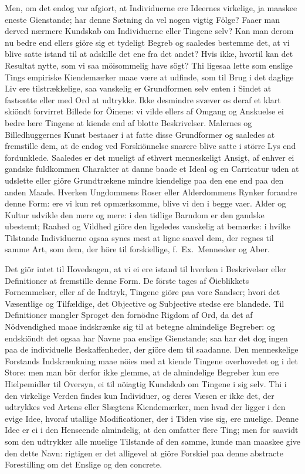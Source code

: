 \documentclass[12pt,a4paper]{article}
\newcommand{\opage}[1]{\marginnote{\footnotesize\textit{[#1]}}}
\begin{document}
Men, om det endog var afgiort, at Individuerne ere Ideernes virkelige, ja
maaskee eneste Gienstande; har denne Sætning da vel nogen vigtig Fölge?
Faaer man derved nærmere Kundskab om Individuerne eller Tingene selv? Kan
man derom nu bedre end ellers giöre sig et tydeligt Begreb og saaledes
bestemme det, at vi blive satte istand til at adskille det ene fra det
andet? Hvis ikke, hvortil kan det Resultat nytte, som vi saa möisommelig
have sögt? Thi ligesaa lette som enslige Tings empiriske Kiendemærker maae
være at udfinde, som til Brug i det daglige Liv ere tilstrækkelige, saa
vanskelig er Grundformen selv enten i Sindet at fastsætte eller med Ord at
udtrykke. Ikke desmindre svæver os deraf et klart skiöndt forvirret Billede
for Öinene: vi vilde ellers af Omgang og Anskuelse ei bedre lære Tingene at
kiende end af blotte Beskrivelser. Malernes og Billedhuggernes Kunst
bestaaer i at fatte disse Grundformer og saaledes at fremstille dem, at de
endog ved Forskiönnelse snarere blive satte i större Lys end fordunklede.
Saaledes er det mueligt af ethvert menneskeligt Ansigt, af enhver ei
gandske fuldkommen Charakter at danne baade et Ideal og en Carricatur uden
at udslette eller giöre Grundtrækene mindre kiendelige paa den ene end paa
den anden
\opage{240} Maade. Hverken Ungdommens Roser eller Alderdommens Rynker forandre denne
Form: ere vi kun ret opmærksomme, blive vi den i begge vaer. Alder og
Kultur udvikle den mere og mere: i den tidlige Barndom er den gandske
ubestemt; Raahed og Vildhed giöre den ligeledes vanskelig at bemærke: i
hvilke Tilstande Individuerne ogsaa synes mest at ligne saavel dem, der
regnes til samme Art, som dem, der höre til forskiellige, f.~Ex.\ Mennesker
og Aber.

Det giör intet til Hovedsagen, at vi ei ere istand til hverken i
Beskrivelser eller Definitioner at fremstille denne Form. De förste tages
af Öieblikkets Fornemmelser, eller af de Indtryk, Tingene giöre paa vore
Sandser; hvori det Væsentlige og Tilfældige, det Objective og Subjective
stedse ere blandede. Til Definitioner mangler Sproget den fornödne Rigdom
af Ord, da det af Nödvendighed maae indskrænke sig til at betegne
almindelige Begreber: og endskiöndt det ogsaa har Navne paa enslige
Gienstande; saa har det dog ingen paa de individuelle Beskaffenheder, der
giöre dem til saadanne. Den menneskelige Forstands Indskrænkning maae nöies
med at kiende Tingene overhovedet og i det Store: men man bör derfor ikke
glemme, at de almindelige Begreber kun ere Hielpemidler til Oversyn, ei til
nöiagtig Kundskab om Tingene i sig selv. Thi i den virkelige Verden findes
kun Individuer, og deres Væsen er ikke det, der udtrykkes ved Artens eller
Slægtens Kiendemærker, men hvad der ligger i den evige Idee, hvoraf utallige
Modificationer, der i Tiden vise sig, ere muelige. Denne Idee er ei i den
Henseende almindelig, at den omfatter flere Ting; men for saavidt som den
udtrykker alle muelige Tilstande af den samme, kunde man maaskee give den
dette Navn: rigtigen er
\opage{241} det alligevel at giöre Forskiel paa denne abstracte Forestilling om det
Enslige og den concrete.
\end{document}
